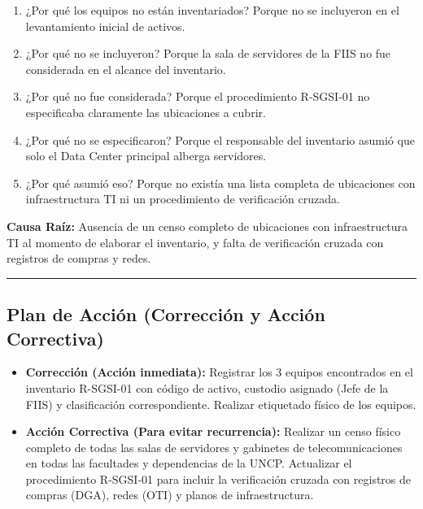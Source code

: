 \documentclass[10pt,letterpaper]{article}
\begin{document}
\begin{enumerate}
\def\labelenumi{\arabic{enumi}.}
\tightlist
\item
  ¿Por qué los equipos no están inventariados? Porque no se incluyeron
  en el levantamiento inicial de activos.
\item
  ¿Por qué no se incluyeron? Porque la sala de servidores de la FIIS no
  fue considerada en el alcance del inventario.
\item
  ¿Por qué no fue considerada? Porque el procedimiento R-SGSI-01 no
  especificaba claramente las ubicaciones a cubrir.
\item
  ¿Por qué no se especificaron? Porque el responsable del inventario
  asumió que solo el Data Center principal alberga servidores.
\item
  ¿Por qué asumió eso? Porque no existía una lista completa de
  ubicaciones con infraestructura TI ni un procedimiento de verificación
  cruzada.
\end{enumerate}

\textbf{Causa Raíz:} Ausencia de un censo completo de ubicaciones con
infraestructura TI al momento de elaborar el inventario, y falta de
verificación cruzada con registros de compras y redes.

\begin{center}\rule{0.5\linewidth}{0.5pt}\end{center}

\subsection{Plan de Acción (Corrección y Acción
Correctiva)}\label{plan-de-acciuxf3n-correcciuxf3n-y-acciuxf3n-correctiva}

\begin{itemize}
\tightlist
\item
  \textbf{Corrección (Acción inmediata):} Registrar los 3 equipos
  encontrados en el inventario R-SGSI-01 con código de activo, custodio
  asignado (Jefe de la FIIS) y clasificación correspondiente. Realizar
  etiquetado físico de los equipos.
\item
  \textbf{Acción Correctiva (Para evitar recurrencia):} Realizar un
  censo físico completo de todas las salas de servidores y gabinetes de
  telecomunicaciones en todas las facultades y dependencias de la UNCP.
  Actualizar el procedimiento R-SGSI-01 para incluir la verificación
  cruzada con registros de compras (DGA), redes (OTI) y planos de
  infraestructura.
\end{itemize}
\end{document}
